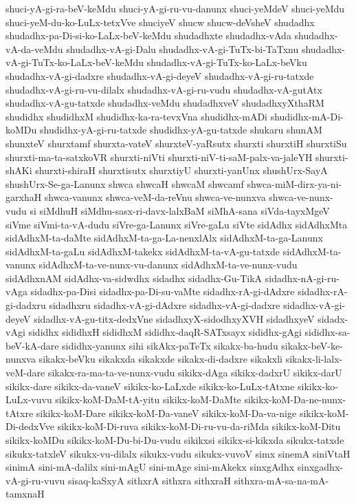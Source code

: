 {shuci-yA-gi-ra-beV-keMdu
shuci-yA-gi-ru-vu-danunx
shuci-yeMdeV
shuci-yeMdu
shuci-yeM-du-ko-LuLx-tetxVve
shuciyeV
shucw
shucw-deVsheV
shudadhx
shudadhx-pa-Di-si-ko-LaLx-beV-keMdu
shudadhxte
shudadhx-vAda
shudadhx-vA-da-veMdu
shudadhx-vA-gi-Dalu
shudadhx-vA-gi-TuTx-bi-TaTxnu
shudadhx-vA-gi-TuTx-ko-LaLx-beV-keMdu
shudadhx-vA-gi-TuTx-ko-LaLx-beVku
shudadhx-vA-gi-dadxre
shudadhx-vA-gi-deyeV
shudadhx-vA-gi-ru-tatxde
shudadhx-vA-gi-ru-vu-dilalx
shudadhx-vA-gi-ru-vudu
shudadhx-vA-gutAtx
shudadhx-vA-gu-tatxde
shudadhx-veMdu
shudadhxveV
shudadhxyXthaRM
shudidhx
shudidhxM
shudidhx-ka-ra-tevxVna
shudidhx-mADi
shudidhx-mA-Di-koMDu
shudidhx-yA-gi-ru-tatxde
shudidhx-yA-gu-tatxde
shukaru
shunAM
shunxteV
shurxtamf
shurxta-vateV
shurxteV-yaRsutx
shurxti
shurxtiH
shurxtiSu
shurxti-ma-ta-satxkoVR
shurxti-niVti
shurxti-niV-ti-saM-palx-va-jaleYH
shurxti-shAKi
shurxti-shiraH
shurxtisutx
shurxtiyU
shurxti-yanUnx
shushUrx-SayA
shushUrx-Se-ga-Lanunx
shwca
shwcaH
shwcaM
shwcamf
shwca-miM-dirx-ya-ni-garxhaH
shwca-vanunx
shwca-veM-da-reVnu
shwca-ve-nunxva
shwca-ve-nunx-vudu
si
siMdhuH
siMdhu-sasx-ri-davx-lalxBaM
siMhA-sana
siVda-tayxMgeV
siVme
siVmi-ta-vA-dudu
siVre-ga-Lanunx
siVre-gaLu
siVte
sidAdhx
sidAdhxMta
sidAdhxM-ta-daMte
sidAdhxM-ta-ga-La-nenxlAlx
sidAdhxM-ta-ga-Lanunx
sidAdhxM-ta-gaLu
sidAdhxM-takekx
sidAdhxM-ta-vA-gu-tatxde
sidAdhxM-ta-vanunx
sidAdhxM-ta-ve-nunx-vu-danunx
sidAdhxM-ta-ve-nunx-vudu
sidAdhxnAM
sidAdhx-va-sidwdhx
sidadhx
sidadhx-Gu-TikA
sidadhx-nA-gi-ru-vAga
sidadhx-pa-Disi
sidadhx-pa-Di-su-vaMte
sidadhx-rA-gi-dAdxre
sidadhx-rA-gi-dadxru
sidadhxru
sidadhx-vA-gi-dAdxre
sidadhx-vA-gi-dadxre
sidadhx-vA-gi-deyeV
sidadhx-vA-gu-titx-dedxVne
sidadhxyX-sidodhxyXVH
sidadhxyeV
sidadx-vAgi
sididhx
sididhxH
sididhxM
sididhx-daqR-SATxsayx
sididhx-gAgi
sididhx-sa-beV-kA-dare
sididhx-yanunx
sihi
sikAkx-paTeTx
sikakx-ba-hudu
sikakx-beV-ke-nunxva
sikakx-beVku
sikakxda
sikakxde
sikakx-di-dadxre
sikakxli
sikakx-li-lalx-veM-dare
sikakx-ra-ma-ta-ve-nunx-vudu
sikikx-dAga
sikikx-dadxrU
sikikx-darU
sikikx-dare
sikikx-da-vaneV
sikikx-ko-LaLxde
sikikx-ko-LuLx-tAtxne
sikikx-ko-LuLx-vuvu
sikikx-koM-DaM-tA-yitu
sikikx-koM-DaMte
sikikx-koM-Da-ne-nunx-tAtxre
sikikx-koM-Dare
sikikx-koM-Da-vaneV
sikikx-koM-Da-va-nige
sikikx-koM-Di-dedxVve
sikikx-koM-Di-ruva
sikikx-koM-Di-ru-vu-da-riMda
sikikx-koM-Ditu
sikikx-koMDu
sikikx-koM-Du-bi-Du-vudu
sikikxsi
sikikx-si-kikxda
sikukx-tatxde
sikukx-tatxleV
sikukx-vu-dilalx
sikukx-vudu
sikukx-vuvoV
simx
sinemA
siniVtaH
sinimA
sini-mA-dalilx
sini-mAgU
sini-mAge
sini-mAkekx
sinxgAdhx
sinxgadhx-vA-gi-ru-vuvu
sisaq-kaSxyA
sithxrA
sithxra
sithxraH
sithxra-mA-sa-na-mA-tamxnaH
}
